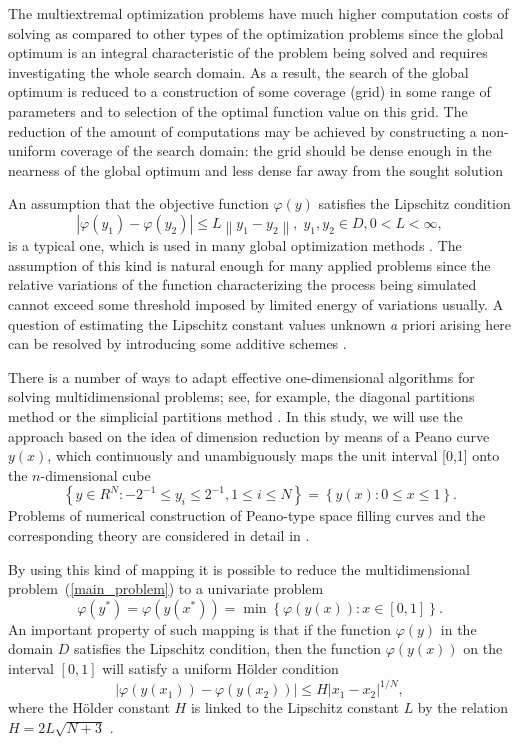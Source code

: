 \documentclass[sensors,article,submit,moreauthors,pdftex]{Definitions/mdpi}
\begin{document}
The multiextremal optimization problems have much higher computation costs of solving as compared to other types of the optimization problems since the global optimum is an integral characteristic of the problem being solved and requires investigating the whole search domain. As a result, the search of the global optimum is reduced to a construction of some coverage (grid) in some range of parameters and to selection of the optimal function value on this grid. The reduction of the amount of computations may be achieved by constructing a non-uniform coverage of the search domain: the grid should be dense enough in the nearness of the global optimum and less dense far away from the sought solution

An assumption that the objective function $\varphi(y)$ satisfies the Lipschitz condition
\[
\left|\varphi(y_1)-\varphi(y_2)\right|\leq L\left\|y_1-y_2\right\|,\; y_1,y_2 \in D, 0<L<\infty,
\]
is a typical one, which is used in many global optimization methods \cite{Sergeyev2013,Evtushenko2013,Jones2009,Zilinskas2010}.
The assumption of this kind is natural enough for many applied problems since the relative variations of the function characterizing the process being simulated cannot exceed some threshold imposed by limited energy of variations usually. A question of estimating the Lipschitz constant values unknown {\textit a priori} arising here can be resolved by introducing some additive schemes \cite{Strongin2020,Strongin2020_1}.

There is a number of ways to adapt effective one-dimensional algorithms for solving multidimensional problems; see, for example, the diagonal partitions method \cite{Sergeyev2017} or the simplicial partitions method \cite{Zilinskas2014}. In this study, we will use the approach based on the idea of dimension reduction by means of a Peano curve $y(x)$, which continuously and unambiguously maps the unit interval [0,1] onto the $n$-dimensional cube
\[
\left\{y\in R^N: -2^{-1}\leq y_i \leq 2^{-1}, 1 \leq i \leq N\right\}=\left\{y(x):0\leq x \leq 1 \right\}.
\]
Problems of numerical construction of Peano-type space filling curves and the corresponding theory are considered in detail in \cite{Strongin2000,Sergeyev2013}.

By using this kind of mapping it is possible to reduce the multidimensional problem~(\ref{main_problem}) to a univariate problem
\[
\varphi(y^\ast)=\varphi(y(x^\ast))=\min{\left\{\varphi(y(x)): x\in[0,1]\right\}}.
\]
An important property of such mapping is that if the function $\varphi(y)$ in the domain $D$ satisfies the Lipschitz condition, then the function $\varphi(y(x))$ on the interval $[0,1]$ will satisfy a uniform H{\"o}lder condition
\[
\left|\varphi(y(x_1))-\varphi(y(x_2))\right|\leq H\left|x_1-x_2\right|^{1/N},
\]
where the H{\"o}lder constant $H$ is linked to the Lipschitz constant $L$ by the relation $H=2L\sqrt{N+3}$ \cite{Strongin2000}.
\end{document}
